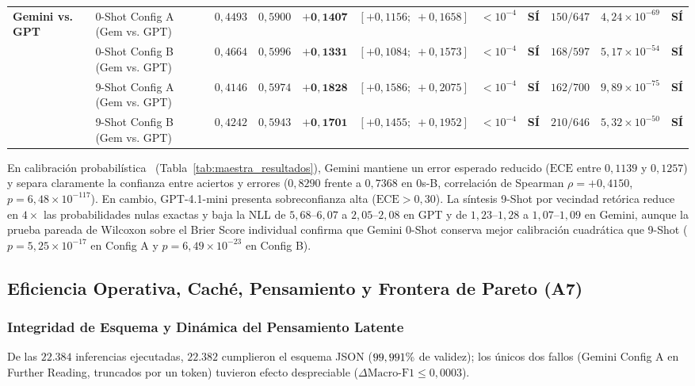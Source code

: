 \documentclass[conference]{IEEEtran}
\newcommand{\pct}{\mbox{\symbol{37}}}
\begin{document}
\begin{table}[t]
{\begin{tabular}{l l c c c c c c c c c}
\midrule
\multirow{4}{*}{\textbf{Gemini vs. GPT}} & 0-Shot Config A (Gem vs. GPT) & $0,4493$ & $0,5900$ & $\mathbf{+0,1407}$ & $[+0,1156;\; +0,1658]$ & $< 10^{-4}$ & \textbf{SÍ} & $150 / 647$ & $4,24\times 10^{-69}$ & \textbf{SÍ} \\
& 0-Shot Config B (Gem vs. GPT) & $0,4664$ & $0,5996$ & $\mathbf{+0,1331}$ & $[+0,1084;\; +0,1573]$ & $< 10^{-4}$ & \textbf{SÍ} & $168 / 597$ & $5,17\times 10^{-54}$ & \textbf{SÍ} \\
& 9-Shot Config A (Gem vs. GPT) & $0,4146$ & $0,5974$ & $\mathbf{+0,1828}$ & $[+0,1586;\; +0,2075]$ & $< 10^{-4}$ & \textbf{SÍ} & $162 / 700$ & $9,89\times 10^{-75}$ & \textbf{SÍ} \\
& 9-Shot Config B (Gem vs. GPT) & $0,4242$ & $0,5943$ & $\mathbf{+0,1701}$ & $[+0,1455;\; +0,1952]$ & $< 10^{-4}$ & \textbf{SÍ} & $210 / 646$ & $5,32\times 10^{-50}$ & \textbf{SÍ} \\
\bottomrule
\end{tabular}%
}
\end{table}

En calibración probabilística~\cite{guo2017calibration,brier1950verification} (Tabla~\ref{tab:maestra_resultados}), Gemini mantiene un error esperado reducido ($\text{ECE}$ entre $0,1139$ y $0,1257$) y separa claramente la confianza entre aciertos y errores ($0,8290$ frente a $0,7368$ en 0s-B, correlación de Spearman $\rho = +0,4150$, $p = 6,48 \times 10^{-117}$). En cambio, GPT-4.1-mini presenta sobreconfianza alta ($\text{ECE} > 0,30$). La síntesis 9-Shot por vecindad retórica reduce en $4\times$ las probabilidades nulas exactas y baja la NLL de $5,68\text{--}6,07$ a $2,05\text{--}2,08$ en GPT y de $1,23\text{--}1,28$ a $1,07\text{--}1,09$ en Gemini, aunque la prueba pareada de Wilcoxon sobre el Brier Score individual confirma que Gemini 0-Shot conserva mejor calibración cuadrática que 9-Shot ($p = 5,25 \times 10^{-17}$ en Config A y $p = 6,49 \times 10^{-23}$ en Config B).

\subsection{Eficiencia Operativa, Caché, Pensamiento y Frontera de Pareto (A7)}

\subsubsection{Integridad de Esquema y Dinámica del Pensamiento Latente}

De las $22.384$ inferencias ejecutadas, $22.382$ cumplieron el esquema JSON ($99,991\pct{}$ de validez); los únicos dos fallos (Gemini Config A en Further Reading, truncados por un token) tuvieron efecto despreciable ($\Delta\text{Macro-F1} \le 0,0003$).
\end{document}
